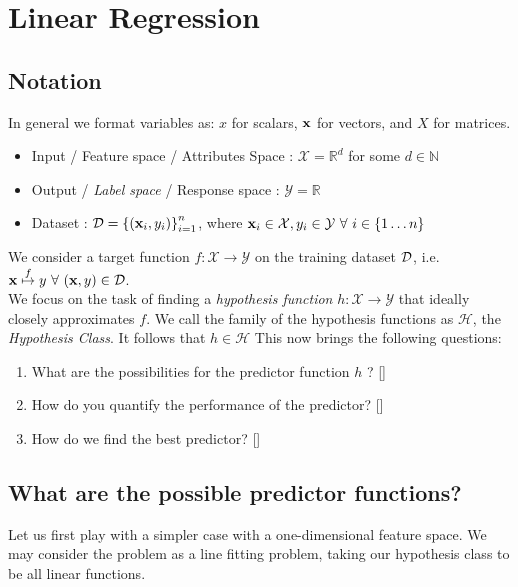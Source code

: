 \chapter{Linear Regression}

\section{Notation}

In general we format variables as: $x$ for scalars, $\mathbf{x}$ for vectors, and $X$ for matrices.
\begin{itemize}
  \item Input / Feature space / Attributes Space :  \(\mathcal{X} =  \mathbb{R}^d\) for some \(d\in\mathbb{N}\)
  \item Output / \emph{Label space} / Response space : \( \mathcal{Y}= \mathbb{R} \)
  \item Dataset : \( \mathcal{D} = \left\{(\textbf{x}_i,y_i)\right\}_{i=1}^{n} \), where \(\tc{x}_i \in \mathcal{X}, y_i \in \mathcal{Y} \ \forall \ i \in \{1\ldots n\}\)
\end{itemize}

We consider a target function $f : \mathcal{X} \to \mathcal{Y}$ on the training dataset $\mathcal{D}$, i.e. $\tc{x} \overset{f}{\mapsto} y \ \forall \ (\x,y) \in \D$. \\

We focus on the task of finding a \emph{hypothesis function} \(h : \mathcal{X} \to \mathcal{Y}\) that ideally closely approximates \(f\). We call the family of the hypothesis functions as \(\mathcal{H}\), the \emph{Hypothesis Class}. It follows that \(h \in \mathcal{H}\)
This now brings the following questions:
\begin{enumerate}
  \item What are the possibilities for the predictor function \(h\) ? []
  \item How do you quantify the performance of the predictor? []
  \item How do we find the best predictor? []
\end{enumerate}

\section{What are the possible predictor functions?}

Let us first play with a simpler case with a one-dimensional feature space. We may consider the problem as a line fitting problem, taking our hypothesis class to be all linear functions.

